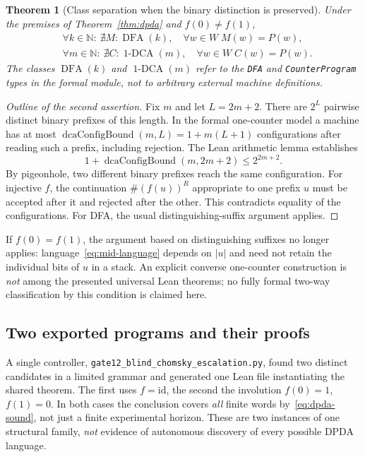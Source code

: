 \documentclass[11pt,a4paper]{article}
\newtheorem{theorem}{Theorem}[section]
\newcommand{\DFA}{\operatorname{DFA}}
\newcommand{\oneDCA}{\operatorname{1\text{-}DCA}}
\begin{document}
\begin{theorem}[Class separation when the binary distinction is preserved]\label{thm:separation}
Under the premises of Theorem~\ref{thm:dpda} and $f(0)\ne f(1)$,
\begin{equation}\label{eq:global-sep}
\begin{aligned}
&\forall k\in\mathbb N:\ \nexists M:\DFA(k),\quad
  \forall w\in W\; M(w)=P(w),\\
&\forall m\in\mathbb N:\ \nexists C:\oneDCA(m),\quad
  \forall w\in W\; C(w)=P(w).
\end{aligned}
\end{equation}
The classes $\DFA(k)$ and $\oneDCA(m)$ refer to the \texttt{DFA} and \texttt{CounterProgram} types in the formal module, not to arbitrary external machine definitions.
\end{theorem}

\begin{proof}[Outline of the second assertion]
Fix $m$ and let $L=2m+2$. There are $2^L$ pairwise distinct binary prefixes of this length. In the formal one-counter model a machine has at most $\operatorname{dcaConfigBound}(m,L)=1+m(L+1)$ configurations after reading such a prefix, including rejection. The Lean arithmetic lemma establishes
\begin{equation}\label{eq:dca-bound}
1+\operatorname{dcaConfigBound}(m,2m+2)\le 2^{2m+2}.
\end{equation}
By pigeonhole, two different binary prefixes reach the same configuration. For injective $f$, the continuation $\#(f(u))^R$ appropriate to one prefix $u$ must be accepted after it and rejected after the other. This contradicts equality of the configurations. For DFA, the usual distinguishing-suffix argument applies.
\end{proof}

If $f(0)=f(1)$, the argument based on distinguishing suffixes no longer applies: language~\eqref{eq:mid-language} depends on $|u|$ and need not retain the individual bits of $u$ in a stack. An explicit converse one-counter construction is \emph{not} among the presented universal Lean theorems; no fully formal two-way classification by this condition is claimed here.

\subsection{Two exported programs and their proofs}

A single controller, \texttt{gate12\_blind\_chomsky\_escalation.py}, found two distinct candidates in a limited grammar and generated one Lean file instantiating the shared theorem. The first uses $f=\mathrm{id}$, the second the involution $f(0)=1$, $f(1)=0$. In both cases the conclusion covers \emph{all} finite words by~\eqref{eq:dpda-sound}, not just a finite experimental horizon. These are two instances of one structural family, \emph{not} evidence of autonomous discovery of every possible DPDA language.
\end{document}

